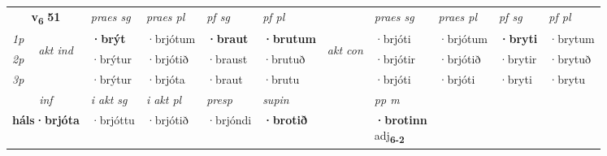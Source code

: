 \noindent
\begin{tabular}{lllllllllll} \toprule
\multicolumn{2}{c}{\textbf{v{\textsubscript{6}}} \Large{\textbf{51}}}  &  \textit{praes sg}  & \textit{praes pl}  &\textit{ pf sg} & \textit{pf pl} &  &  \textit{praes sg}  & \textit{praes pl}  & \textit{pf sg} & \textit{pf pl } \\*
	\cmidrule{3-6} \cmidrule{8-11}
 {\textit{1p}} & \multirow{3}{*}{\begin{turn}{90}\textit{akt ind}\end{turn}} & \textbf{·brýt} & ·brjótum & \textbf{·braut} & \textbf{·brutum} & \multirow{3}{*}{\begin{turn}{90}\textit{akt con}\end{turn}} &·brjóti & ·brjótum & \textbf{·bryti} & ·brytum\\*
 {\textit{2p}} &  &  ·brýtur  & ·brjótið & ·braust & ·brutuð & & ·brjótir & ·brjótið & ·brytir & ·brytuð \\*
{\textit{3p}} &  & ·brýtur & ·brjóta & ·braut & ·brutu & & ·brjóti & ·brjóti& ·bryti & ·brytu \\*
\cmidrule{3-6} \cmidrule{8-11}

   \multicolumn{2}{c}{\textit{inf}}  & \textit{i akt sg} & \textit{i akt pl}   & \textit{presp} & \textit{supin}  && \textit{pp m} \\*
  \multicolumn{2}{c}{\textbf{háls\allowbreak ·brjóta}} & ·brjóttu  & ·brjótið   & ·brjóndi &  \textbf{·brotið}  && \specialcell{\textbf{·brotinn} \\ adj\textbf{\textsubscript{6-2}}} \\*
\end{tabular}

